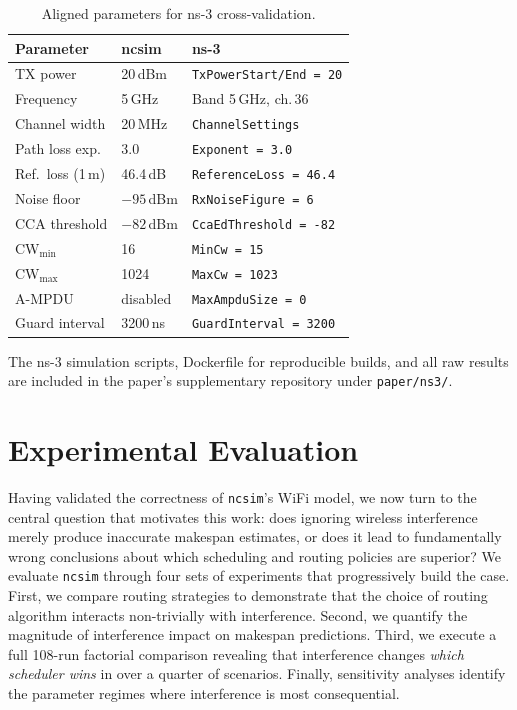 \documentclass[conference]{IEEEtran}
\newcommand{\ncsim}{\texttt{ncsim}}
\begin{document}
\begin{table}[t]
\centering
\caption{Aligned parameters for ns-3 cross-validation.}
\label{tab:ns3_params}
\begin{tabular}{@{}lll@{}}
\toprule
\textbf{Parameter} & \textbf{ncsim} & \textbf{ns-3} \\
\midrule
TX power & 20\,dBm & \texttt{TxPowerStart/End = 20} \\
Frequency & 5\,GHz & Band 5\,GHz, ch.\,36 \\
Channel width & 20\,MHz & \texttt{ChannelSettings} \\
Path loss exp. & 3.0 & \texttt{Exponent = 3.0} \\
Ref.\ loss (1\,m) & 46.4\,dB & \texttt{ReferenceLoss = 46.4} \\
Noise floor & $-95$\,dBm & \texttt{RxNoiseFigure = 6} \\
CCA threshold & $-82$\,dBm & \texttt{CcaEdThreshold = -82} \\
CW$_{\min}$ & 16 & \texttt{MinCw = 15} \\
CW$_{\max}$ & 1024 & \texttt{MaxCw = 1023} \\
A-MPDU & disabled & \texttt{MaxAmpduSize = 0} \\
Guard interval & 3200\,ns & \texttt{GuardInterval = 3200} \\
\bottomrule
\end{tabular}
\end{table}

The ns-3 simulation scripts, Dockerfile for reproducible builds, and all
raw results are included in the paper's supplementary repository under
\texttt{paper/ns3/}.


\section{Experimental Evaluation}
\label{sec:eval}

Having validated the correctness of \ncsim{}'s WiFi model, we now turn to
the central question that motivates this work: does ignoring wireless
interference merely produce inaccurate makespan estimates, or does it lead
to fundamentally wrong conclusions about which scheduling and routing
policies are superior?  We evaluate \ncsim{} through four sets of
experiments that progressively build the case.  First, we compare routing
strategies to demonstrate that the choice of routing algorithm interacts
non-trivially with interference.  Second, we quantify the magnitude of
interference impact on makespan predictions.  Third, we execute a full
108-run factorial comparison revealing that interference changes \emph{which
scheduler wins} in over a quarter of scenarios.  Finally, sensitivity
analyses identify the parameter regimes where interference is most
consequential.
\end{document}
